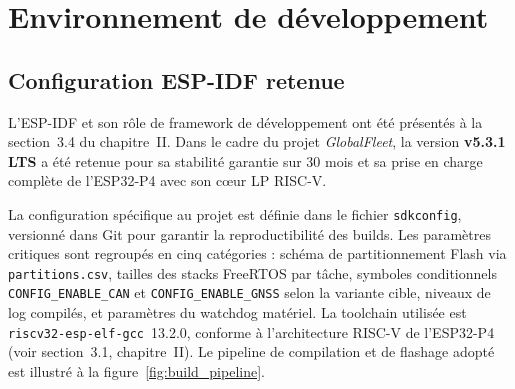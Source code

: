 \section{Environnement de développement}
\label{sec:env_ch4}

\subsection{Configuration ESP-IDF retenue}
\label{subsec:espidf}

L'ESP-IDF et son rôle de framework de développement ont été présentés
à la section~3.4 du chapitre~II. Dans le cadre du projet
\textit{GlobalFleet}, la version \textbf{v5.3.1 LTS} a été retenue
pour sa stabilité garantie sur 30 mois et sa prise en charge complète
de l'ESP32-P4 avec son c\oe{}ur LP RISC-V.

La configuration spécifique au projet est définie dans le fichier
\texttt{sdkconfig}, versionné dans Git pour garantir la reproductibilité
des builds. Les paramètres critiques sont regroupés en cinq catégories :
schéma de partitionnement Flash via \texttt{partitions.csv}, tailles
des stacks FreeRTOS par tâche, symboles conditionnels
\texttt{CONFIG\_ENABLE\_CAN} et \texttt{CONFIG\_ENABLE\_GNSS} selon
la variante cible, niveaux de log compilés, et paramètres du watchdog
matériel.
\newpage
La toolchain utilisée est \texttt{riscv32-esp-elf-gcc}~13.2.0,
conforme à l'architecture RISC-V de l'ESP32-P4 (voir section~3.1,
chapitre~II). Le pipeline de compilation et de flashage adopté est
illustré à la figure~\ref{fig:build_pipeline}.

